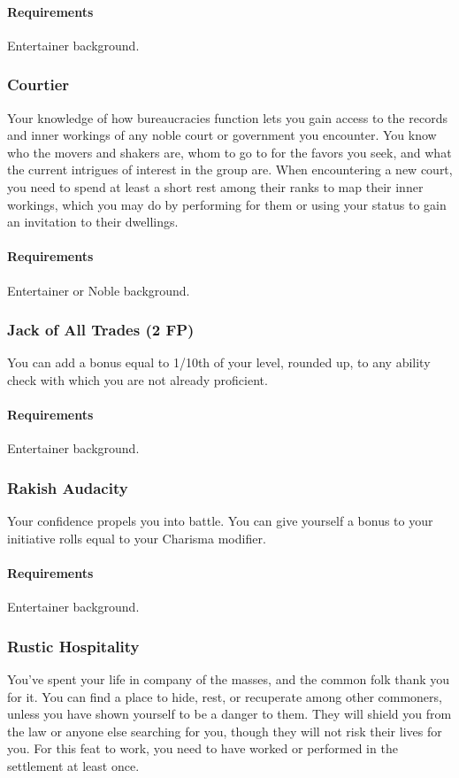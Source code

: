             \paragraph{Requirements} Entertainer background.
        \subsubsection{Courtier} \label{feat::courtier}
            Your knowledge of how bureaucracies function lets you gain access to the records and inner workings of any noble court or government you encounter.
            You know who the movers and shakers are, whom to go to for the favors you seek, and what the current intrigues of interest in the group are.
            When encountering a new court, you need to spend at least a short rest among their ranks to map their inner workings, which you may do by performing for them or using your status to gain an invitation to their dwellings.
            \paragraph{Requirements} Entertainer or Noble background.
        \subsubsection{Jack of All Trades (2 FP)} \label{feat::jackofalltrades}
            You can add a bonus equal to 1/10th of your level, rounded up, to any ability check with which you are not already proficient.
            \paragraph{Requirements} Entertainer background.
        \subsubsection{Rakish Audacity} \label{feat::rakishaudacity}
            Your confidence propels you into battle.
            You can give yourself a bonus to your initiative rolls equal to your Charisma modifier.
            \paragraph{Requirements} Entertainer background.
        \subsubsection{Rustic Hospitality} \label{feat::rustichospitality}
            You've spent your life in company of the masses, and the common folk thank you for it.
            You can find a place to hide, rest, or recuperate among other commoners, unless you have shown yourself to be a danger to them.
            They will shield you from the law or anyone else searching for you, though they will not risk their lives for you.
            For this feat to work, you need to have worked or performed in the settlement at least once.
